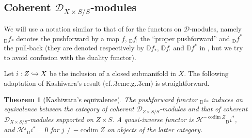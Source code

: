 \documentclass[english]{smfart}
\numberwithin{subsection}{section}
\def\shd{\mathcal{D}}\let\cD\shd
\def\shh{\mathcal{H}}
\def\shh{\mathcal{H}}
\newcommand{\DD}{\mathbb{D}}
\newcommand{\XS}{X\times S}
\newcommand{\DXS}{\shd_{\XS/S}}
\newcommand{\DZS}{\shd_{Z\times S/S}}
\DeclareMathOperator{\codim}{codim}
\def\cf{cf.\kern.3em}
\def\eg{e.g.\kern.3em}
\newcommand{\Df}{{}_{\scriptscriptstyle\mathrm{D}}f}
\newcommand{\Di}{{}_{\scriptscriptstyle\mathrm{D}}i}
\numberwithin{equation}{section}
\theoremstyle{plain}
\newtheorem{theorem}[equation]{Theorem}
\theoremstyle{definition}
\def\to{\mathchoice{\longrightarrow}{\rightarrow}{\rightarrow}{\rightarrow}}
\def\hto{\mathrel{\lhook\joinrel\to}}
\begin{document}
\subsection{Coherent \texorpdfstring{$\DXS$}{DXS/S}-modules}
We will use a notation similar to that of \cite{Kashiwara03} for the functors on $\cD$-modules, namely $\Df_*$ denotes the pushforward by a map $f$, $\Df_!$ the ``proper pushforward'' and $\Df^*$ the pull-back (they are denoted respectively by $\DD f_*$, $\DD f_!$ and $\DD f^*$ in \cite{Kashiwara03}, but we try to avoid confusion with the duality functor).

Let $i:Z\hto X$ be the inclusion of a closed submanifold in $X$. The following adaptation of Kashiwara's result (\cf\eg \cite[\S4.8]{Kashiwara03}) is straightforward.

\begin{theorem}[Kashiwara's equivalence]\label{th:kashiwaraequivalence}
The pushforward functor $\Di_*$ induces an equivalence between the category of coherent $\DZS$-modules and that of coherent $\DXS$-modules supported on $Z\times S$. A quasi-inverse functor is $\shh^{-\codim Z}\Di^*$, and $\shh^j \Di^*\!=\!0$ for $j\neq-\codim Z$ on objects of the latter category.
\end{theorem}
\end{document}
